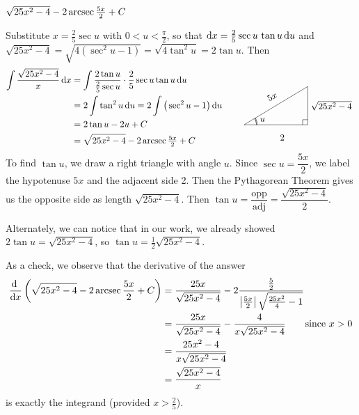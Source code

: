 \begin{answer} 
$\sqrt{25x^2-4}-2\mathop{\mathrm{arcsec}}\frac{5x}{2}  + C$
\end{answer}

\begin{solution} 
Substitute $x=\frac{2}{5}\sec u$ with $0< u<\frac{\pi}{2}$, so that 
$\mathrm{d}x=\frac{2}{5} \sec u\,\tan u\,\mathrm{d}u$ and
$\sqrt{25 x^2-4} = \sqrt{4(\sec^2u-1)} = \sqrt{4\tan^2u}=2\tan u$. Then
\begin{align*}
\int \frac{\sqrt{25x^2-4}}{x}\,\dee{x}
&=\int \frac{2\tan u}{\frac{2}{5}\sec u}\cdot\frac{2}{5}\sec u\tan u\,\dee{u} \\
&=2\int \tan^2 u\,\dee{u}
=2\int \big(\sec^2 u -1\big)\,\dee{u} \\
&= 2\tan u -2u + C \\
&=\sqrt{25x^2-4}-2\arcsec\tfrac{5x}{2}  + C
\hskip0.75in\smash{
\trigtri{u}{2}{\sqrt{25x^2-4}}{5x}} 
\end{align*}
To find $\tan u$, we draw a right triangle with angle $u$. Since $\sec u =\dfrac{5x}{2}$, we label the hypotenuse $5x$ and the adjacent side 2. Then the Pythagorean Theorem gives us the opposite side as length $\sqrt{25x^2-4}$. Then $\tan u = \dfrac{\mbox{opp}}{\mbox{adj}} = \dfrac{\sqrt{25x^2-4}}{2}$.

Alternately, we can notice that in our work, we already showed $2\tan u = \sqrt{25x^2-4}$, so $\tan u = \frac{1}{2}\sqrt{25x^2-4} .$

As a check, we observe that the derivative of the answer
\begin{align*}
\diff{}{x} \left(\sqrt{25x^2-4}-2\arcsec\frac{5x}{2}  + C\right)
&=\frac{25 x}{\sqrt{25x^2-4}} 
      - 2 \frac{\frac{5}{2}}{\left|\frac{5x}{2}\right|\sqrt{\frac{25x^2}{4}-1}} \\
&= \frac{25 x}{\sqrt{25x^2-4}}   - \frac{4}{x\sqrt{25x^2-4}}\qquad\text{since $x>0$} \\
&=  \frac{25 x^2-4}{x\sqrt{25x^2-4}} \\
&=  \frac{\sqrt{25 x^2-4}}{x}
\end{align*}
is exactly the integrand (provided $x>\frac{2}{5}$).
\end{solution}

